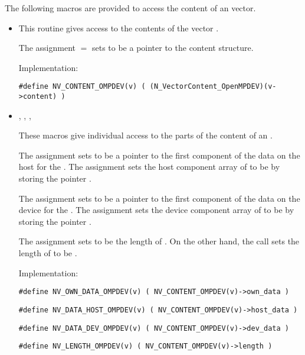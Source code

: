 The following macros are provided to access the content of an {\nvecopenmpdev}
vector.
\begin{itemize}

\item {}

  This routine gives access to the contents of the {\nvecopenmpdev}
  vector .

  The assignment  $=$  sets
   to be a pointer to the {\nvecopenmpdev}  content
  structure.

  Implementation:

  \verb|#define NV_CONTENT_OMPDEV(v) ( (N_VectorContent_OpenMPDEV)(v->content) )|

\item {}, , , 

  These macros give individual access to the parts of
  the content of an {\nvecopenmpdev} .

  The assignment  sets  to be
  a pointer to the first component of the data on the host for the  .
  The assignment  sets the host component array of  to
  be  by storing the pointer .

  The assignment  sets  to be
  a pointer to the first component of the data on the device for the  .
  The assignment  sets the device component array of  to
  be  by storing the pointer .

  The assignment  sets  to be
  the length of . On the other hand, the call 
  sets the length of  to be .

  Implementation:

  \verb|#define NV_OWN_DATA_OMPDEV(v) ( NV_CONTENT_OMPDEV(v)->own_data )|

  \verb|#define NV_DATA_HOST_OMPDEV(v) ( NV_CONTENT_OMPDEV(v)->host_data )|

  \verb|#define NV_DATA_DEV_OMPDEV(v) ( NV_CONTENT_OMPDEV(v)->dev_data )|

  \verb|#define NV_LENGTH_OMPDEV(v) ( NV_CONTENT_OMPDEV(v)->length )|

\end{itemize}


